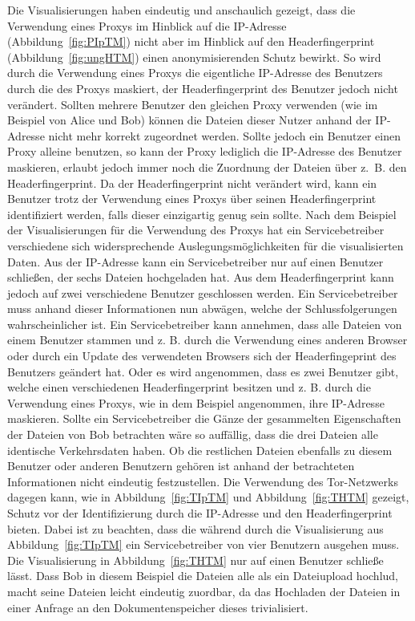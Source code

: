 \documentclass[
    fontsize=12pt,
    headings=small,
    parskip=half,           %
    bibliography=totoc,
    numbers=noenddot,       %
    open=any,               %
    ]{scrreprt}
\begin{document}
Die Visualisierungen haben eindeutig und anschaulich gezeigt, dass die Verwendung eines Proxys im Hinblick auf die IP-Adresse (Abbildung~\ref{fig:PIpTM}) nicht aber im Hinblick auf den Headerfingerprint (Abbildung~\ref{fig:ungHTM}) einen anonymisierenden Schutz bewirkt.
So wird durch die Verwendung eines Proxys die eigentliche IP-Adresse des Benutzers durch die des Proxys maskiert, der Headerfingerprint des Benutzer jedoch nicht verändert.
Sollten mehrere Benutzer den gleichen Proxy verwenden (wie im Beispiel von Alice und Bob) können die Dateien dieser Nutzer anhand der IP-Adresse nicht mehr korrekt zugeordnet werden. 
Sollte jedoch ein Benutzer einen Proxy alleine benutzen, so kann der Proxy lediglich die IP-Adresse des Benutzer maskieren, erlaubt jedoch immer noch die Zuordnung der Dateien über z.~B. den Headerfingerprint.
Da der Headerfingerprint nicht verändert wird, kann ein Benutzer trotz der Verwendung eines Proxys über seinen Headerfingerprint identifiziert werden, falls dieser einzigartig genug sein sollte.
Nach dem Beispiel der Visualisierungen für die Verwendung des Proxys
hat ein Servicebetreiber verschiedene sich widersprechende Auslegungsmöglichkeiten für die visualisierten Daten.
Aus der IP-Adresse kann ein Servicebetreiber nur auf einen Benutzer schließen, der sechs Dateien hochgeladen hat.
Aus dem Headerfingerprint kann jedoch auf zwei verschiedene Benutzer geschlossen werden. 
Ein Servicebetreiber muss anhand dieser Informationen nun abwägen, welche der Schlussfolgerungen wahrscheinlicher ist. 
Ein Servicebetreiber kann annehmen, dass alle Dateien von einem Benutzer stammen und z. B. durch die Verwendung eines anderen Browser oder durch ein Update des verwendeten Browsers sich der Headerfingeprint des Benutzers geändert hat.
Oder es wird angenommen, dass es zwei Benutzer gibt, welche einen verschiedenen Headerfingerprint besitzen und z. B. durch die Verwendung eines Proxys, wie in dem Beispiel angenommen, ihre IP-Adresse maskieren.
Sollte ein Servicebetreiber die Gänze der gesammelten Eigenschaften der Dateien von Bob betrachten wäre so auffällig, dass die drei Dateien alle identische Verkehrsdaten haben.
Ob die restlichen Dateien ebenfalls zu diesem Benutzer oder anderen Benutzern gehören ist anhand der betrachteten Informationen nicht eindeutig festzustellen.
Die Verwendung des Tor-Netzwerks dagegen kann, wie in Abbildung~\ref{fig:TIpTM} und Abbildung~\ref{fig:THTM} gezeigt, Schutz vor der Identifizierung durch die IP-Adresse und den Headerfingerprint bieten.
Dabei ist zu beachten, dass die während durch die Visualisierung aus Abbildung~\ref{fig:TIpTM} ein Servicebetreiber von vier Benutzern ausgehen muss.
Die Visualisierung in Abbildung~\ref{fig:THTM} nur auf einen Benutzer schließe lässt.
Dass Bob in diesem Beispiel die Dateien alle als ein Dateiupload hochlud, macht seine Dateien leicht eindeutig zuordbar, da das Hochladen der Dateien in einer Anfrage an den Dokumentenspeicher dieses trivialisiert.
\end{document}
